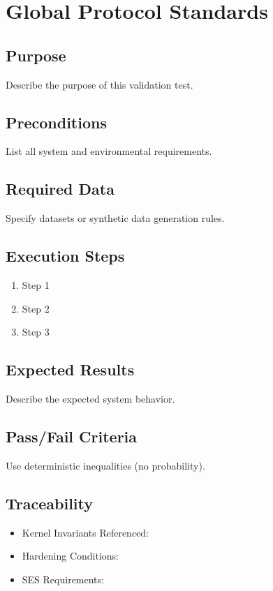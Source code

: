 

\section*{Global Protocol Standards}

\subsection*{Purpose}
Describe the purpose of this validation test.

\subsection*{Preconditions}
List all system and environmental requirements.

\subsection*{Required Data}
Specify datasets or synthetic data generation rules.

\subsection*{Execution Steps}
\begin{enumerate}
    \item Step 1
    \item Step 2
    \item Step 3
\end{enumerate}

\subsection*{Expected Results}
Describe the expected system behavior.

\subsection*{Pass/Fail Criteria}
Use deterministic inequalities (no probability).

\subsection*{Traceability}
\begin{itemize}
    \item Kernel Invariants Referenced:
    \item Hardening Conditions:
    \item SES Requirements:
\end{itemize}
